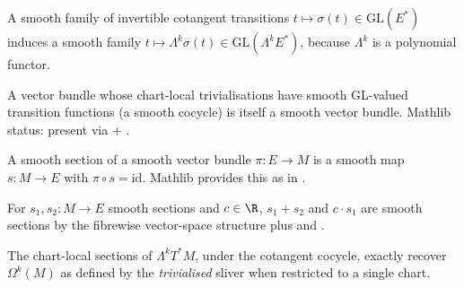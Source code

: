 \begin{lemma}
\label{lem:r9subA-exp-r2}
A smooth family of invertible cotangent transitions
\(t\mapsto\sigma(t)\in\mathrm{GL}(E^{*})\) induces a smooth family
\(t\mapsto\Lambda^{k}\sigma(t)\in\mathrm{GL}(\Lambda^{k}E^{*})\),
because \(\Lambda^{k}\) is a polynomial functor.
\leanok
\end{lemma}

\begin{lemma}
\label{lem:r9subA-exp-r3}
A vector bundle whose chart-local trivialisations have smooth
GL-valued transition functions (a smooth cocycle) is itself a
smooth vector bundle.  Mathlib status: present via
 + .
\leanok\mathlibok
\end{lemma}

\begin{lemma}
\label{lem:r9subA-sec-r1}
A smooth section of a smooth vector bundle \(\pi:E\to M\) is a
smooth map \(s:M\to E\) with \(\pi\circ s=\mathrm{id}\).  Mathlib
provides this as  in
.
\leanok\mathlibok
\end{lemma}

\begin{lemma}
\label{lem:r9subA-sec-r2}
For \(s_{1},s_{2}:M\to E\) smooth sections and \(c\in\R\),
\(s_{1}+s_{2}\) and \(c\cdot s_{1}\) are smooth sections by the
fibrewise vector-space structure plus  and
.
\leanok\mathlibok
\end{lemma}

\begin{lemma}
\label{lem:r9subA-omeq-r1}
The chart-local sections of \(\Lambda^{k}T^{*}M\), under the
cotangent cocycle, exactly recover \(\Omega^{k}(M)\) as defined by
the \emph{trivialised} sliver
 when
restricted to a single chart.
\leanok
\end{lemma}

